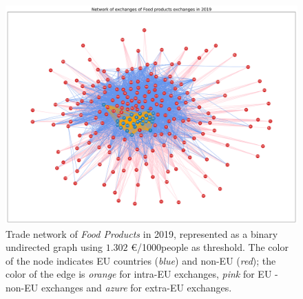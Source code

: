 \begin{figure}
    \centering
    \includegraphics[width=\textwidth]{pics/complete_y19_p10_bin_7.png}
    \caption[Trade network of \textit{Food Products} in 2019, represented as a binary graph.]{Trade network of \textit{Food Products} in 2019, represented as a binary undirected graph using $1.302$ €/1000people as threshold. The color of the node indicates EU countries (\textit{blue}) and non-EU (\textit{red}); the color of the edge is \textit{orange} for intra-EU exchanges, \textit{pink} for EU - non-EU exchanges and \textit{azure} for extra-EU exchanges.}
    \label{fig:foodbingraph}
\end{figure}